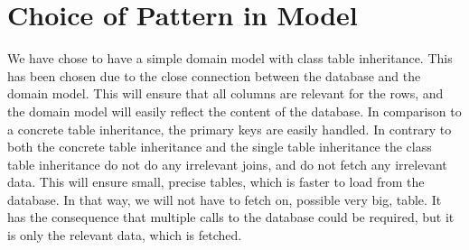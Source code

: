 \section{Choice of Pattern in Model}
We have chose to have a simple domain model with class table inheritance. This has been chosen due to the close connection between the database and the domain model. This will ensure that all columns are relevant for the rows, and the domain model will easily reflect the content of the database.
In comparison to a concrete table inheritance, the primary keys are easily handled.
In contrary to both the concrete table inheritance and the single table inheritance the class table inheritance do not do any irrelevant joins, and do not fetch any irrelevant data.
This will ensure small, precise tables, which is faster to load from the database.
In that way, we will not have to fetch on, possible very big, table. It has the consequence that multiple calls to the database could be required, but it is only the relevant data, which is fetched.